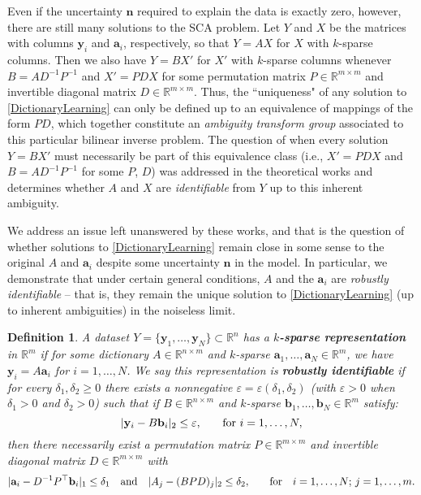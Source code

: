 \documentclass[journal, onecolumn]{IEEEtran}
\newtheorem{definition}{Definition}
\begin{document}
Even if the uncertainty $\mathbf{n}$ required to explain the data is exactly zero, however, there are still many solutions to the SCA problem. Let $Y$ and $X$ be the matrices with columns $\mathbf{y}_i$ and $\mathbf{a}_i$, respectively, so that $Y = AX$ for $X$ with $k$-sparse columns. Then we also have $Y = BX'$ for $X'$ with $k$-sparse columns whenever $B = AD^{-1}P^{-1}$ and $X' = PDX$ for some permutation matrix $P \in \mathbb{R}^{m \times m}$ and invertible diagonal matrix $D \in \mathbb{R}^{m \times m}$. Thus, the ``uniqueness" of any solution to \eqref{DictionaryLearning} can only be defined up to an equivalence of mappings of the form $PD$, which together constitute an \emph{ambiguity transform group} \cite{BilinInv} associated to this particular bilinear inverse problem. The question of when every solution $Y = BX'$ must necessarily be part of this equivalence class (i.e., $X' = PDX$ and $B = AD^{-1}P^{-1}$ for some $P$, $D$) was addressed in the theoretical works \cite{Georgiev05, Aharon06, Hillar15} and determines whether $A$ and $X$ are \emph{identifiable} from $Y$ up to this inherent ambiguity.

We address an issue left unanswered by these works, and that is the question of whether solutions to \eqref{DictionaryLearning} remain close in some sense to the original $A$ and $\mathbf{a}_i$ despite some uncertainty $\mathbf{n}$ in the model. In particular, we demonstrate that under certain general conditions, $A$ and the $\mathbf{a}_i$ are \emph{robustly identifiable} -- that is, they remain the unique solution to \eqref{DictionaryLearning} (up to inherent ambiguities) in the noiseless limit.

\begin{definition}\label{Uniqueness}
A dataset $Y = \{\mathbf{y}_1, \ldots, \mathbf{y}_N\} \subset \mathbb{R}^n$ has a \textbf{$k$-sparse representation} in $\mathbb{R}^m$ if for some dictionary $A \in \mathbb{R}^{n \times m}$ and $k$-sparse $\mathbf{a}_1, \ldots, \mathbf{a}_N \in \mathbb{R}^m$, we have $\mathbf{y}_i = A\mathbf{a}_i$ for $i = 1, \ldots, N$. We say this representation is \textbf{robustly identifiable} if for every $\delta_1, \delta_2 \geq 0$ there exists a nonnegative $\varepsilon = \varepsilon(\delta_1, \delta_2)$ (with $\varepsilon > 0$ when $\delta_1 > 0$ and $\delta_2 > 0$) such that if $B \in \mathbb{R}^{n \times m}$ and $k$-sparse $\mathbf{b}_1, \ldots, \mathbf{b}_N \in \mathbb{R}^m$ satisfy:
\[|\mathbf{y}_i - B\mathbf{b}_i|_2 \leq \varepsilon,\indent \text{ for } i = 1, \ldots, N,\]
%
then there necessarily exist a permutation matrix $P \in \mathbb{R}^{m \times m}$ and invertible diagonal matrix $D \in \mathbb{R}^{m \times m}$ with
\begin{align}\label{def1}
|\mathbf{a}_i - D^{-1}P^{\top}\mathbf{b}_i|_1 \leq \delta_1 \ \ \text{ and } \ \ |A_j - (BPD)_j|_2 \leq \delta_2,\indent  \text{ for } \ \ i = 1, \ldots, N; \, j = 1, \ldots, m.
\end{align}
\end{definition}
\end{document}

